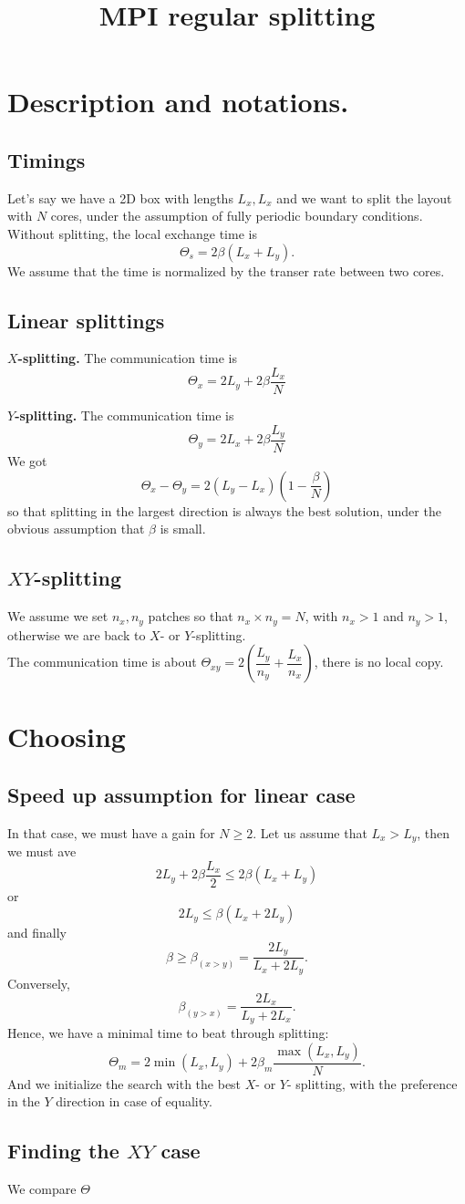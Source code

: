 \documentclass[aps]{revtex4}
\begin{document}
\title{MPI regular splitting}
\maketitle
	
\section{Description and notations.}
\subsection{Timings}
Let's say we have a 2D box with lengths $L_x,L_x$ and
we want to split the layout with $N$ cores, under the assumption
of fully periodic boundary conditions.\\

Without splitting, the local exchange time is
$$
	\Theta_s =  2\beta \left(L_x+L_y\right).	
$$
We assume that the time is normalized
by the transer rate between two cores.

\subsection{Linear splittings}

\textbf{$X$-splitting.}
The communication time is
$$
	\Theta_x =  2 L_y + 2\beta \dfrac{L_x}{N}
$$

\textbf{$Y$-splitting.}
The communication time is
$$
	\Theta_y = 2 L_x + 2\beta \dfrac{L_y}{N}
$$
We got
$$
	\Theta_x - \Theta_y = 2\left(L_y-L_x\right)\left(1-\dfrac{\beta}{N}\right)
$$	
so that splitting in the largest direction is always the best solution, under
the obvious assumption that $\beta$ is small.

\subsection{$XY$-splitting} 
We assume we set $n_x,n_y$ patches so that $n_x\times n_y=N$,
with $n_x>1$ and $n_y>1$, otherwise we are back to $X$- or $Y$-splitting.\\
The communication time is about $\Theta_{xy}=2\left(\dfrac{L_y}{n_y}+\dfrac{L_x}{n_x}\right)$,
there is no local copy.

\section{Choosing}
\subsection{Speed up assumption for linear case}
In that case, we must have a gain for $N\geq2$.
Let us assume that $L_x>L_y$, then we must ave
$$
	 2 L_y + 2\beta \dfrac{L_x}{2} \leq 2\beta \left(L_x+L_y\right)
$$
or
$$
	2 L_y \leq \beta \left(L_x+2L_y\right)
$$
and finally
$$
	\beta \geq \beta_{(x>y)}= \dfrac{2L_y}{L_x+2L_y}.
$$
Conversely, 
$$
	\beta_{(y>x)}=\dfrac{2L_x}{L_y+2L_x}.
$$
Hence, we have a minimal time to beat through splitting:
$$	
	\Theta_m = 2  \min(L_x,L_y) + 2\beta_m \dfrac{\max(L_x,L_y)}{N}.
$$
And we initialize the search with the best $X$- or $Y$- splitting, 
with the preference in the $Y$ direction in case of equality.
 
\subsection{Finding the $XY$ case}
We compare $\Theta$
\end{document}
